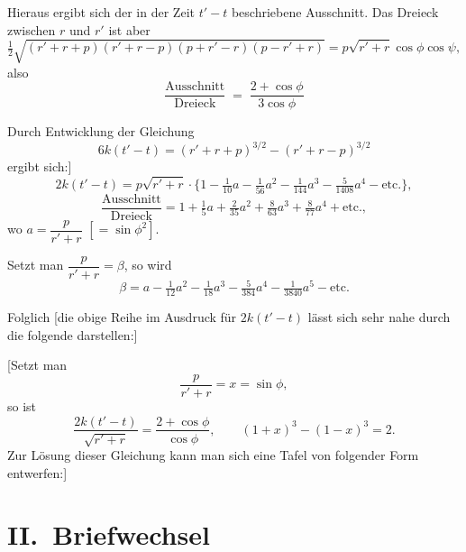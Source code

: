\documentclass[11pt,a4paper]{article}
\begin{document}
Hieraus ergibt sich der in der Zeit $t' - t$ beschriebene Ausschnitt.
Das Dreieck zwischen $r$ und $r'$ ist aber
\[
  \tfrac{1}{2}\sqrt{(r' + r + p)(r' + r - p)(p + r' - r)(p - r' + r)}
   = p\sqrt{r' + r}\cos\phi\cos\psi,
\]
also
\[
   \boxed{\;\frac{\text{Ausschnitt}}{\text{Dreieck}}
          \;=\; \frac{2 + \cos\phi}{3\cos\phi}\;}
\]

\bigskip

Durch Entwicklung der Gleichung
\[
  6k(t' - t) = (r' + r + p)^{3/2} - (r' + r - p)^{3/2}
\]
ergibt sich:]
\[
  2 k (t' - t) = p\sqrt{r' + r}\cdot
     \bigl\{ 1 - \tfrac{1}{10}a - \tfrac{1}{56}a^{2}
              - \tfrac{1}{144}a^{3} - \tfrac{5}{1408}a^{4} - \text{etc.}\bigr\},
\]
\[
  \frac{\text{Ausschnitt}}{\text{Dreieck}}
   = 1 + \tfrac{1}{5}a + \tfrac{2}{35}a^{2} + \tfrac{8}{63}a^{3}
        + \tfrac{8}{77}a^{4} + \text{etc.},
\]
wo $a = \dfrac{p}{r' + r}$ $[= \sin\phi^{2}]$.

\medskip

Setzt man $\dfrac{p}{r' + r} = \beta$, so wird
\[
  \beta = a - \tfrac{1}{12}a^{2} - \tfrac{1}{18}a^{3} - \tfrac{5}{384}a^{4}
            - \tfrac{1}{3840}a^{5} - \text{etc.}
\]

Folglich [die obige Reihe im Ausdruck für $2k(t' - t)$ lässt sich
sehr nahe durch die folgende darstellen:]

\medskip

[Setzt man
\[
  \frac{p}{r' + r} = x = \sin\phi,
\]
so ist
\[
  \frac{2k(t' - t)}{\sqrt{r' + r}} = \frac{2 + \cos\phi}{\cos\phi},
  \qquad
  (1 + x)^{3} - (1 - x)^{3} = 2.
\]
Zur Lösung dieser Gleichung kann man sich eine Tafel von folgender Form
entwerfen:]

\medskip


\bigskip

\section*{II.~Briefwechsel}
\end{document}
